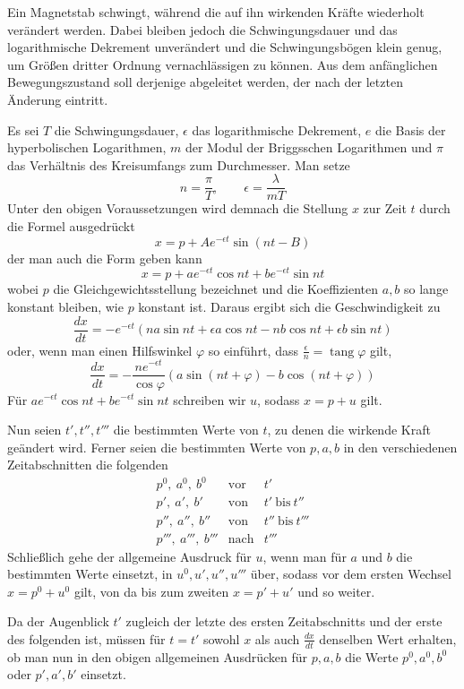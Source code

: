 Ein Magnetstab schwingt, während die auf ihn wirkenden Kräfte wiederholt verändert werden. Dabei bleiben jedoch die Schwingungsdauer und das logarithmische Dekrement unverändert und die Schwingungsbögen klein genug, um Größen dritter Ordnung vernachlässigen zu können. Aus dem anfänglichen Bewegungszustand soll derjenige abgeleitet werden, der nach der letzten Änderung eintritt.

Es sei $T$ die Schwingungsdauer, $\epsilon$ das logarithmische Dekrement, $e$ die Basis der hyperbolischen Logarithmen, $m$ der Modul der Briggsschen Logarithmen und $\pi$ das Verhältnis des Kreisumfangs zum Durchmesser. Man setze
\[
n=\frac{\pi}{T},\qquad \epsilon=\frac{\lambda}{mT}
\]
Unter den obigen Voraussetzungen wird demnach die Stellung $x$ zur Zeit $t$ durch die Formel ausgedrückt
\[
x=p+Ae^{-\epsilon t}\sin(nt-B)
\]
der man auch die Form geben kann
\[
x=p+ae^{-\epsilon t}\cos nt+be^{-\epsilon t}\sin nt
\]
wobei $p$ die Gleichgewichtsstellung bezeichnet und die Koeffizienten $a,b$ so lange konstant bleiben, wie $p$ konstant ist. Daraus ergibt sich die Geschwindigkeit zu
\[
\frac{dx}{dt}=-e^{-\epsilon t}(na\sin nt+\epsilon a\cos nt-nb\cos nt+\epsilon b\sin nt)
\]
oder, wenn man einen Hilfswinkel $\varphi$ so einführt, dass $\frac{\epsilon}{n}=\operatorname{tang}\varphi$ gilt,
\[
\frac{dx}{dt}=-\frac{ne^{-\epsilon t}}{\cos\varphi}(a\sin(nt+\varphi)-b\cos(nt+\varphi))
\]
Für $ae^{-\epsilon t}\cos nt+be^{-\epsilon t}\sin nt$ schreiben wir $u$, sodass $x=p+u$ gilt.

Nun seien $t',t'',t'''$ die bestimmten Werte von $t$, zu denen die wirkende Kraft geändert wird. Ferner seien die bestimmten Werte von $p,a,b$ in den verschiedenen Zeitabschnitten die folgenden
\[
\begin{array}{lll}
p^0,\ a^0,\ b^0&\text{vor}&t'\\
p',\ a',\ b'&\text{von}&t'\ \text{bis}\ t''\\
p'',\ a'',\ b''&\text{von}&t''\ \text{bis}\ t'''\\
p''',\ a''',\ b'''&\text{nach}&t'''
\end{array}
\]
Schließlich gehe der allgemeine Ausdruck für $u$, wenn man für $a$ und $b$ die bestimmten Werte einsetzt, in $u^0,u',u'',u'''$ über, sodass vor dem ersten Wechsel $x=p^0+u^0$ gilt, von da bis zum zweiten $x=p'+u'$ und so weiter.

Da der Augenblick $t'$ zugleich der letzte des ersten Zeitabschnitts und der erste des folgenden ist, müssen für $t=t'$ sowohl $x$ als auch $\frac{dx}{dt}$ denselben Wert erhalten, ob man nun in den obigen allgemeinen Ausdrücken für $p,a,b$ die Werte $p^0,a^0,b^0$ oder $p',a',b'$ einsetzt.

